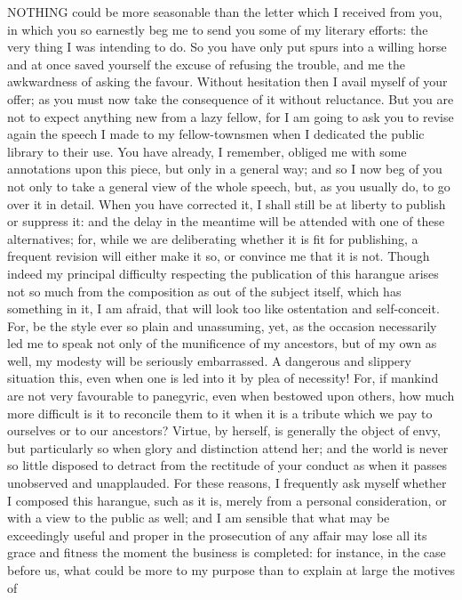 NOTHING could be more seasonable than the letter which I received from
you, in which you so earnestly beg me to send you some of my literary
efforts: the very thing I was intending to do. So you have only put spurs
into a willing horse and at once saved yourself the excuse of refusing the
trouble, and me the awkwardness of asking the favour. Without hesitation
then I avail myself of your offer; as you must now take the consequence of
it without reluctance. But you are not to expect anything new from a lazy
fellow, for I am going to ask you to revise again the speech I made to my
fellow-townsmen when I dedicated the public library to their use. You have
already, I remember, obliged me with some annotations upon this piece, but
only in a general way; and so I now beg of you not only to take a general
view of the whole speech, but, as you usually do, to go over it in detail.
When you have corrected it, I shall still be at liberty to publish or
suppress it: and the delay in the meantime will be attended with one of
these alternatives; for, while we are deliberating whether it is fit for
publishing, a frequent revision will either make it so, or convince me
that it is not. Though indeed my principal difficulty respecting the
publication of this harangue arises not so much from the composition as
out of the subject itself, which has something in it, I am afraid, that
will look too like ostentation and self-conceit. For, be the style ever so
plain and unassuming, yet, as the occasion necessarily led me to speak not
only of the munificence of my ancestors, but of my own as well, my modesty
will be seriously embarrassed. A dangerous and slippery situation this,
even when one is led into it by plea of necessity! For, if mankind are not
very favourable to panegyric, even when bestowed upon others, how much
more difficult is it to reconcile them to it when it is a tribute which we
pay to ourselves or to our ancestors? Virtue, by herself, is generally the
object of envy, but particularly so when glory and distinction attend her;
and the world is never so little disposed to detract from the rectitude of
your conduct as when it passes unobserved and unapplauded. For these
reasons, I frequently ask myself whether I composed this harangue, such as
it is, merely from a personal consideration, or with a view to the public
as well; and I am sensible that what may be exceedingly useful and proper
in the prosecution of any affair may lose all its grace and fitness the
moment the business is completed: for instance, in the case before us,
what could be more to my purpose than to explain at large the motives of
